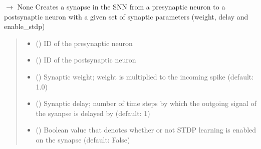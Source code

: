 \documentclass[letterpaper,10pt,english]{sphinxmanual}
\begin{document}
\begin{fulllineitems}
\begin{fulllineitems}
\label{\detokenize{index:id2}}
\pysigstartsignatures
\pysiglinewithargsret
{}
{\sphinxparamcomma {}\sphinxparamcomma {}\sphinxparamcomma {}\sphinxparamcomma {}}
{{ $\rightarrow$ None}}
\pysigstopsignatures
\sphinxAtStartPar
Creates a synapse in the SNN from a pre\sphinxhyphen{}synaptic neuron to a post\sphinxhyphen{}synaptic neuron with a given set of synaptic parameters (weight, delay and enable\_stdp)
\begin{quote}\begin{description}
\begin{itemize}
\item {} 
\sphinxAtStartPar
{} () \textendash{} ID of the pre\sphinxhyphen{}synaptic neuron

\item {} 
\sphinxAtStartPar
{} () \textendash{} ID of the post\sphinxhyphen{}synaptic neuron

\item {} 
\sphinxAtStartPar
{} () \textendash{} Synaptic weight; weight is multiplied to the incoming spike (default: 1.0)

\item {} 
\sphinxAtStartPar
{} () \textendash{} Synaptic delay; number of time steps by which the outgoing signal of the syanpse is delayed by (default: 1)

\item {} 
\sphinxAtStartPar
{} () \textendash{} Boolean value that denotes whether or not STDP learning is enabled on the synapse (default: False)


\end{itemize}
\end{description}
\end{quote}
\end{fulllineitems}
\end{fulllineitems}
\end{document}
